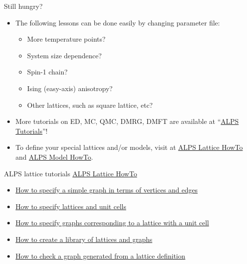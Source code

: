 \begin{frame}[t,fragile]{Still hungry?}
  \begin{itemize}
  \item The following lessons can be done easily by changing parameter file:
    \begin{itemize}
    \item More temperature points?
    \item System size dependence?
    \item Spin-1 chain?
    \item Ising (easy-axis) anisotropy?
    \item Other lattices, such as square lattice, etc?
    \end{itemize}
  \item More tutorials on ED, MC, QMC, DMRG, DMFT are available at ``\href{http://alps.comp-phys.org/mediawiki/index.php/ALPS_2_Tutorials:Overview}{ALPS Tutorials}''!
  \item To define your special lattices and/or models, visit at \href{http://alps.comp-phys.org/mediawiki/index.php/Tutorials:LatticeHOWTO}{ALPS Lattice HowTo} and \href{http://alps.comp-phys.org/mediawiki/index.php/Tutorials:ModelHOWTO}{ALPS Model HowTo}.
  \end{itemize}
\end{frame}

\begin{frame}[t,fragile]{ALPS lattice tutorials}
  \href{http://alps.comp-phys.org/mediawiki/index.php/Tutorials:LatticeHOWTO}{ALPS Lattice HowTo} \\
  \begin{itemize}
    \item \href{http://alps.comp-phys.org/mediawiki/index.php/Tutorials:LatticeHOWTO:SimpleGraphs}{How to specify a simple graph in terms of vertices and edges}
    \item \href{http://alps.comp-phys.org/mediawiki/index.php/Tutorials:LatticesAndUnitCells}{How to specify lattices and unit cells}
    \item \href{http://alps.comp-phys.org/mediawiki/index.php/Tutorials:LatticesAndGraphs}{How to specify graphs corresponding to a lattice with a unit cell}
    \item \href{http://alps.comp-phys.org/mediawiki/index.php/Tutorials:LatticeHOWTO:Library}{How to create a library of lattices and graphs}
    \item \href{http://alps.comp-phys.org/mediawiki/index.php/Tutorials:LatticeHowto:CheckLattice}{How to check a graph generated from a lattice definition}
  \end{itemize}
\end{frame}

